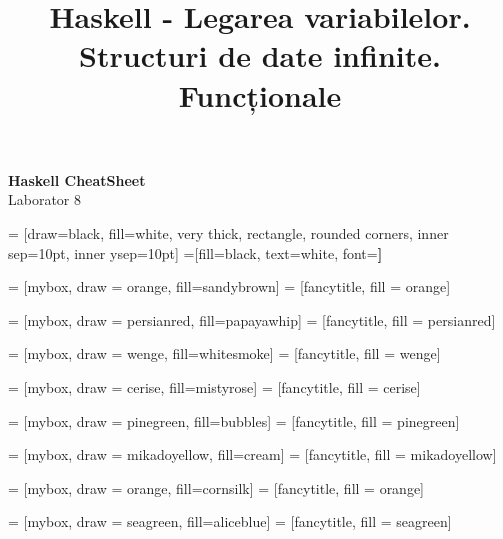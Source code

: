 \documentclass[a4paper]{article}
\title{Haskell - Legarea variabilelor. Structuri de date infinite. Funcționale}
\begin{document}
\begin{center}{\huge{\textbf{Haskell CheatSheet}}}\\
{\large Laborator 8}
\end{center}

\begin{multicols*}{3}

 = [draw=black, fill=white, very thick,
    rectangle, rounded corners, inner sep=10pt, inner ysep=10pt]
 =[fill=black, text=white, font=\bfseries]

 = [mybox, draw = orange, fill=sandybrown]
 = [fancytitle, fill = orange]


 = [mybox, draw = persianred, fill=papayawhip]
 = [fancytitle, fill = persianred]

 = [mybox, draw = wenge, fill=whitesmoke]
 = [fancytitle, fill = wenge]

 = [mybox, draw = cerise, fill=mistyrose]
 = [fancytitle, fill = cerise]

 = [mybox, draw = pinegreen, fill=bubbles]
 = [fancytitle, fill = pinegreen]

 = [mybox, draw = mikadoyellow, fill=cream]
 = [fancytitle, fill = mikadoyellow]

 = [mybox, draw = orange, fill=cornsilk]
 = [fancytitle, fill = orange]

 = [mybox, draw = seagreen, fill=aliceblue]
 = [fancytitle, fill = seagreen]


\end{multicols*}
\end{document}
